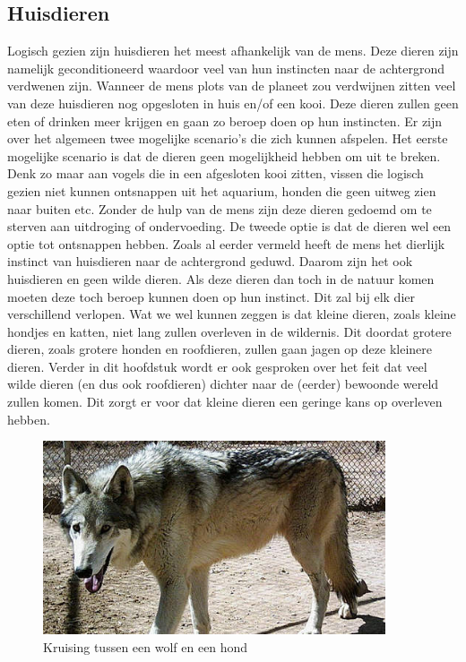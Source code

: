 \subsection{Huisdieren}
Logisch gezien zijn huisdieren het meest afhankelijk van de mens. Deze dieren zijn namelijk geconditioneerd waardoor veel van hun instincten naar de achtergrond verdwenen zijn. Wanneer de mens plots van de planeet zou verdwijnen zitten veel van deze huisdieren nog opgesloten in huis en/of een kooi. Deze dieren zullen geen eten of drinken meer krijgen en gaan zo beroep doen op hun instincten. Er zijn over het algemeen twee mogelijke scenario's die zich kunnen afspelen.
\newline
Het eerste mogelijke scenario is dat de dieren geen mogelijkheid hebben om uit te breken. Denk zo maar aan vogels die in een afgesloten kooi zitten, vissen die logisch gezien niet kunnen ontsnappen uit het aquarium, honden die geen uitweg zien naar buiten etc. Zonder de hulp van de mens zijn deze dieren gedoemd om te sterven aan uitdroging of ondervoeding.
\newline
De tweede optie is dat de dieren wel een optie tot ontsnappen hebben. Zoals al eerder vermeld heeft de mens het dierlijk instinct van huisdieren naar de achtergrond geduwd. Daarom zijn het ook huisdieren en geen wilde dieren. Als deze dieren dan toch in de natuur komen moeten deze toch beroep kunnen doen op hun instinct. Dit zal bij elk dier verschillend verlopen. Wat we wel kunnen zeggen is dat kleine dieren, zoals kleine hondjes en katten, niet lang zullen overleven in de wildernis. Dit doordat grotere dieren, zoals grotere honden en roofdieren, zullen gaan jagen op deze kleinere dieren. Verder in dit hoofdstuk wordt er ook gesproken over het feit dat veel wilde dieren (en dus ook roofdieren) dichter naar de (eerder) bewoonde wereld zullen komen. Dit zorgt er voor dat kleine dieren een geringe kans op overleven hebben. 
\newline
\begin{figure}
  \centering
    \includegraphics[width=0.9\textwidth]{WolfHond.jpg}
  \caption{Kruising tussen een wolf en een hond \cite{redactieHLN}}
  \label{fig:wolfhond}
\end{figure}
